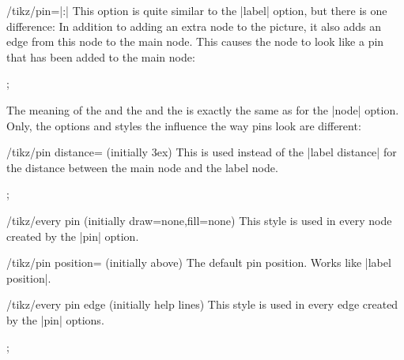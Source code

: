 \begin{key}{/tikz/pin=|:|}
  This option is quite similar to the |label| option, but there is
  one difference: In addition to adding an extra node to the picture,
  it also adds an edge from this node to the main node. This causes
  the node to look like a pin that has been added to the main node:
\begin{codeexample}[]
\tikz \node [circle,fill=blue!50,minimum size=1cm,pin=60:$q_0$] {};
\end{codeexample}

  The meaning of the  and the  and the
   is exactly the same as for the |node| option. Only, the
  options and styles the influence the way pins look are different:
  \begin{key}{/tikz/pin distance= (initially 3ex)}
    This  is used instead of the |label distance| for
    the distance between the main node and the label node.
\begin{codeexample}[]
\tikz[pin distance=1cm]
  ;
\end{codeexample}
  \end{key}
  \begin{stylekey}{/tikz/every pin (initially {draw=none,fill=none})}
    This style is used in every node created by the |pin|
    option.
  \end{stylekey}
  \begin{key}{/tikz/pin position= (initially above)}
    The default pin position. Works like |label position|.
  \end{key}
  \begin{stylekey}{/tikz/every pin edge (initially help lines)}
    This style is used in every edge created by the |pin| options.
\begin{codeexample}[]
\tikz [pin distance=15mm,
       every pin edge/.style={<-,shorten <=1pt,decorate,
                              decoration={snake,pre length=4pt}}]
  ;
\end{codeexample}
  \end{stylekey}


\end{key}
